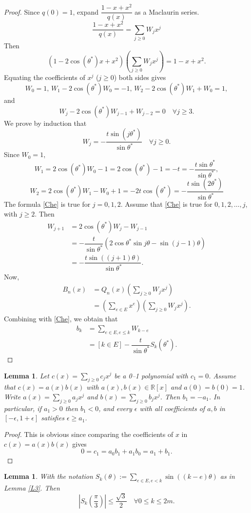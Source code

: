 \documentclass[a4paper,12pt,english,reqno]{amsart}
\newtheorem{lem}[thm]{Lemma}
\theoremstyle{definition}
\theoremstyle{remark}
\newcommand{\R}{{\mathbb R}}
\begin{document}
\begin{proof} Since $q(0)=1$, expand $\dfrac{1-x+x^2}{q(x)}$ as a Maclaurin series.
 \[\dfrac{1-x+x^2}{q(x)}=\sum\limits_{j\geq 0}W_jx^j\]
 Then \[\left(1-2\cos(\theta^*)x+x^2\right)\left(\sum\limits_{j\geq 0}W_jx^j\right)=1-x+x^2.\]
Equating the coefficients of $x^j$ ($j\geq 0$) both sides gives \[W_0=1,\,W_1-2\cos(\theta^*)W_0=-1,\,W_2-2\cos(\theta^*)W_1+W_0=1,\]
and \[W_j-2\cos(\theta^*)W_{j-1}+W_{j-2}=0\quad\forall j\geq 3.\]
We prove by induction that \begin{equation}\label{Che}W_j=-\dfrac{t\sin(j\theta^*)}{\sin\theta^*}\quad\forall j\geq 0.\end{equation}
Since $W_0=1$, \[W_1=2\cos(\theta^*)W_0-1=2\cos\left(\theta^*\right)-1=-t=-\dfrac{t\sin\theta^*}{\sin\theta^*},\]
\[W_2=2\cos(\theta^*)W_1-W_0+1=-2t\cos(\theta^*)=-\dfrac{t\sin(2\theta^*)}{\sin\theta^*}\]
The formula \eqref{Che} is true for $j=0,1,2$. Assume that \eqref{Che} is true for $0,1,2,\ldots,j$, with $j\geq 2$. Then \[\begin{split}W_{j+1}&=2\cos(\theta^*)W_{j}-W_{j-1}\\
&=-\dfrac{t}{\sin\theta^*}\left(2\cos\theta^*\sin j\theta-\sin(j-1)\theta\right)\\
&=-\dfrac{t\sin((j+1)\theta)}{\sin\theta^*}.
\end{split}\]
Now, \[\begin{split}B_n(x)&=Q_n(x)\left(\sum\limits_{j\geq 0}W_jx^j\right)\\
&=\left(\sum\limits_{e\in E}x^e\right)\left(\sum\limits_{j\geq 0}W_jx^j\right).
\end{split}\]
Combining with \eqref{Che}, we obtain that \[\begin{split}b_k&=\sum\limits_{e\in E,e\leq k}W_{k-e}\\
&=[k\in E]-\dfrac{t}{\sin\theta^*}S_k(\theta^*).\end{split}\]
\end{proof}
\begin{lem}\label{Pro1}
Let $c(x)=\sum\limits_{j\geq 0}c_jx^j$ be a 0--1 polynomial with $c_1=0$. Assume that $c(x)=a(x)b(x)$ with $a(x),b(x)\in \R[x]$ and $a(0)=b(0)=1$. Write $a(x)=\sum\limits_{j\geq 0}a_jx^j$ and $b(x)=\sum\limits_{j\geq 0}b_jx^j$. Then $b_1=-a_1$. In particular, if $a_1>0$ then $b_1<0$, and every $\epsilon$ with all coefficients of $a,b$ in $[-\epsilon,1+\epsilon]$ satisfies $\epsilon\geq a_1$.
\end{lem}
\begin{proof} This is obvious since comparing the coefficients of $x$ in $c(x)=a(x)b(x)$ gives \[0=c_1=a_0b_1+a_1b_0=a_1+b_1.\]
\end{proof}
\begin{lem}\label{L5} With the notation $S_k(\theta):=\sum\limits_{e\in E,e<k}\sin\left((k-e)\theta\right)$ as in Lemma \ref{L3}. Then \[|S_k(\dfrac{\pi}{3})|\leq \dfrac{\sqrt{3}}{2}\quad\forall 0\leq k\leq 2m.\]
\end{lem}
\end{document}
